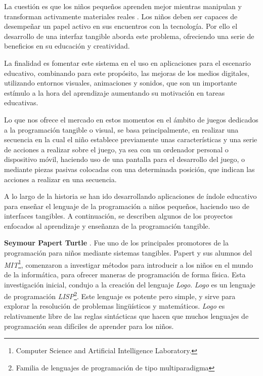 La cuestión es que los niños pequeños aprenden mejor mientras manipulan y transforman activamente materiales reales \cite{Beaty}.
Los niños deben ser capaces de desempeñar un papel activo en sus encuentros con la tecnología. Por ello el desarrollo de una interfaz tangible aborda este problema, ofreciendo una serie de beneficios en su educación y creatividad. 

La finalidad es fomentar este sistema en el uso en aplicaciones para el escenario educativo, combinando para este propósito, las mejoras de los medios digitales, utilizando entornos visuales, animaciones y sonidos, que son un importante estímulo a la hora del aprendizaje aumentando su motivación en tareas educativas.

Lo que nos ofrece el mercado en estos momentos en el ámbito de juegos dedicados a la programación tangible o visual, se basa principalmente, en realizar una secuencia en la cual el niño establece previamente unas características y una serie de acciones a realizar sobre el juego, ya sea con un ordenador personal o dispositivo móvil, haciendo uso de una pantalla para el desarrollo del juego, o mediante piezas pasivas colocadas con una determinada posición, que indican las acciones a realizar en una secuencia.

A lo largo de la historia se han ido desarrollando aplicaciones de índole educativo para enseñar el lenguaje de la programación a niños pequeños, haciendo uso de interfaces tangibles. A continuación, se describen algunos de los proyectos enfocados al aprendizaje y enseñanza de la programación tangible.


\textbf{Seymour Papert Turtle} \cite{Papert}. Fue uno de los principales promotores de la programación para niños mediante sistemas tangibles. Papert y sus alumnos del \emph{MIT}\footnote{Computer Science and Artificial Intelligence Laboratory.}, comenzaron a investigar métodos para introducir a los niños en el mundo de la informática, para ofrecer maneras de programación de forma física. Esta investigación inicial, condujo a la creación del lenguaje \emph{Logo}. \emph{Logo} es un lenguaje de programación \emph{LISP}\footnote{Familia de lenguajes de programación de tipo multiparadigma}. Este lenguaje es potente pero simple, y sirve para explorar la resolución de problemas lingüísticos y matemáticos. \emph{Logo} es relativamente libre de las reglas sintácticas que hacen que muchos lenguajes de programación sean difíciles de aprender para los niños.

